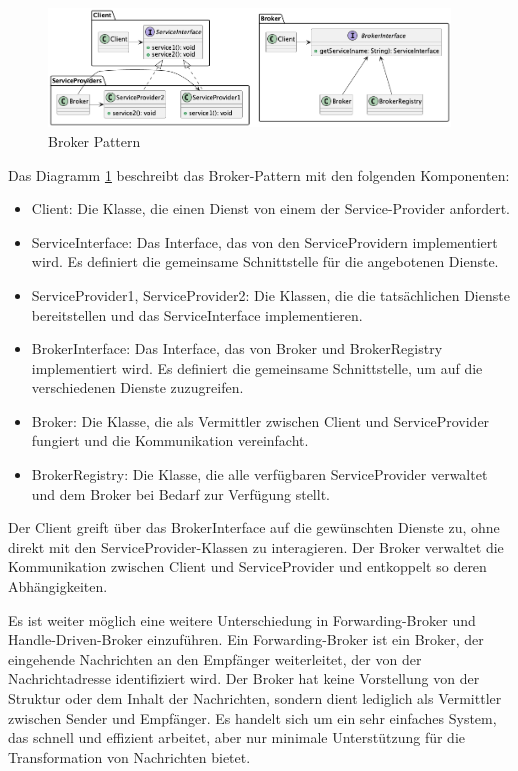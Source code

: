\begin{figure}[ht]
  \centering
  \includegraphics[width=0.95\textwidth]{fig/uml/broker.png}
  \caption{Broker Pattern}
  \label{fig:broker}
\end{figure}

Das Diagramm \ref{fig:broker} beschreibt das Broker-Pattern mit den folgenden Komponenten:
\begin{itemize}
\item Client: Die Klasse, die einen Dienst von einem der Service-Provider anfordert.
\item ServiceInterface: Das Interface, das von den ServiceProvidern implementiert wird. Es definiert die gemeinsame Schnittstelle für die angebotenen Dienste.
\item ServiceProvider1, ServiceProvider2: Die Klassen, die die tatsächlichen Dienste bereitstellen und das ServiceInterface implementieren.
\item BrokerInterface: Das Interface, das von Broker und BrokerRegistry implementiert wird. Es definiert die gemeinsame Schnittstelle, um auf die verschiedenen Dienste zuzugreifen.
\item Broker: Die Klasse, die als Vermittler zwischen Client und ServiceProvider fungiert und die Kommunikation vereinfacht.
\item BrokerRegistry: Die Klasse, die alle verfügbaren ServiceProvider verwaltet und dem Broker bei Bedarf zur Verfügung stellt.
\end{itemize}
Der Client greift über das BrokerInterface auf die gewünschten Dienste zu, ohne direkt mit den ServiceProvider-Klassen zu interagieren. Der Broker verwaltet die Kommunikation zwischen Client und ServiceProvider und entkoppelt so deren Abhängigkeiten.

Es ist weiter möglich eine weitere Unterschiedung in Forwarding-Broker und Handle-Driven-Broker einzuführen. 
Ein Forwarding-Broker ist ein Broker, der eingehende Nachrichten an den Empfänger weiterleitet, der von der Nachrichtadresse identifiziert wird. Der Broker hat keine Vorstellung von der Struktur oder dem Inhalt der Nachrichten, sondern dient lediglich als Vermittler zwischen Sender und Empfänger. Es handelt sich um ein sehr einfaches System, das schnell und effizient arbeitet, aber nur minimale Unterstützung für die Transformation von Nachrichten bietet.

